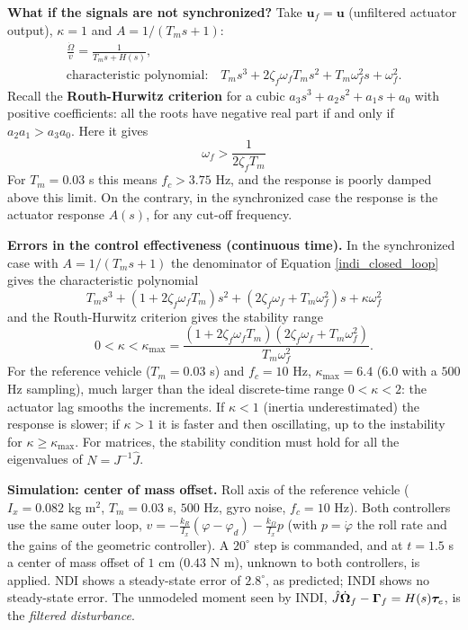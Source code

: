 \documentclass[10pt, a4paper]{report}
\begin{document}
\noindent\textbf{What if the signals are not synchronized?} Take $\mathbf u_f=\mathbf u$ (unfiltered actuator output), $\kappa=1$ and $A=1/(T_ms+1)$:\begin{gather*}
    \frac{\dot\Omega}{v}=\frac{1}{T_ms+H(s)},\\[1ex]\text{characteristic polynomial:}\quad T_ms^3+2\zeta_f\omega_fT_ms^2+T_m\omega_f^2s+\omega_f^2.
\end{gather*}
Recall the \textbf{Routh-Hurwitz criterion} for a cubic $a_3s^3+a_2s^2+a_1s+a_0$ with positive coefficients: all the roots have negative real part if and only if $a_2a_1>a_3a_0$. Here it gives
\begin{equation}
    \omega_f>\frac{1}{2\zeta_fT_m}
\end{equation}
For $T_m=0.03$ s this means $f_c>3.75$ Hz, and the response is poorly damped above this limit. On the contrary, in the synchronized case the response is the actuator response $A(s)$, for any cut-off frequency.\bigskip

\noindent\textbf{Errors in the control effectiveness (continuous time).} In the synchronized case with $A=1/(T_ms+1)$ the denominator of Equation \eqref{indi_closed_loop} gives the characteristic polynomial
\begin{equation}
    T_ms^3+(1+2\zeta_f\omega_fT_m)s^2+(2\zeta_f\omega_f+T_m\omega_f^2)s+\kappa\omega_f^2
\end{equation}
and the Routh-Hurwitz criterion gives the stability range
\begin{equation}
    0<\kappa<\kappa_{\max}=\frac{(1+2\zeta_f\omega_fT_m)(2\zeta_f\omega_f+T_m\omega_f^2)}{T_m\omega_f^2}.
\end{equation}
For the reference vehicle ($T_m=0.03$ s) and $f_c=10$ Hz, $\kappa_{\max}=6.4$ ($6.0$ with a $500$ Hz sampling), much larger than the ideal discrete-time range $0<\kappa<2$: the actuator lag smooths the increments. If $\kappa<1$ (inertia underestimated) the response is slower; if $\kappa>1$ it is faster and then oscillating, up to the instability for $\kappa\ge\kappa_{\max}$. For matrices, the stability condition must hold for all the eigenvalues of $N=J^{-1}\hat J$.\bigskip

\noindent\textbf{Simulation: center of mass offset.} Roll axis of the reference vehicle ($I_x=0.082$ kg m$^2$, $T_m=0.03$ s, $500$ Hz, gyro noise, $f_c=10$ Hz). Both controllers use the same outer loop, $v=-\frac{k_R}{I_x}(\varphi-\varphi_d)-\frac{k_\Omega}{I_x}p$ (with $p=\dot\varphi$ the roll rate and the gains of the geometric controller). A $20^\circ$ step is commanded, and at $t=1.5$ s a center of mass offset of $1$ cm ($0.43$ N m), unknown to both controllers, is applied. NDI shows a steady-state error of $2.8^\circ$, as predicted; INDI shows no steady-state error. The unmodeled moment seen by INDI, $\hat J\dot{{\boldsymbol{\Omega}}}_f-\boldsymbol{\Gamma}_f=H(s){\boldsymbol{\tau}}_e$, is the \textit{filtered disturbance}.
\end{document}

